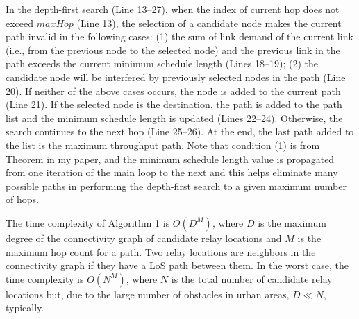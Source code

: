 \documentclass[paper=a4, fontsize=11pt]{scrartcl}
\numberwithin{equation}{section}		%
\numberwithin{figure}{section}			%
\numberwithin{table}{section}				%
\begin{document}
In the depth-first search (Line 13--27), when the index of current hop does not 
exceed $maxHop$ (Line 13), the selection of a candidate node makes the current 
path invalid in the following cases: (1) the sum of link demand of the current 
link (i.e., from the previous node to the selected node) and the previous link in 
the path exceeds the current minimum schedule length (Lines 18--19); (2) the  
candidate node will be interfered by previously selected nodes in the path (Line 
20). If neither of the above cases occurs, the node is added to the current path 
(Line 21).  If the selected node is the destination, the path is added to the 
path list and the minimum schedule length is updated (Lines 22--24).  Otherwise, 
the search continues to the next hop (Line 25--26).  At the end, the last path
added to the list is the maximum throughput path. Note that condition (1) is from 
Theorem in my paper, and the minimum schedule length value is propagated 
from one iteration of the main loop to the next and this helps eliminate many 
possible paths in performing the depth-first search to a given maximum number of 
hops.

The time complexity of Algorithm 1 is $O(D^M)$, where $D$ is the maximum degree
of the connectivity graph of candidate relay locations and $M$ is the maximum
hop count for a path.  Two relay locations are neighbors in the connectivity
graph if they have a LoS path between them.  In the worst case, the time 
complexity is $O(N^M)$, where $N$ is the total number of candidate relay
locations but, due to the large number of obstacles in urban areas,
$D\ll N$, typically.
\end{document}
